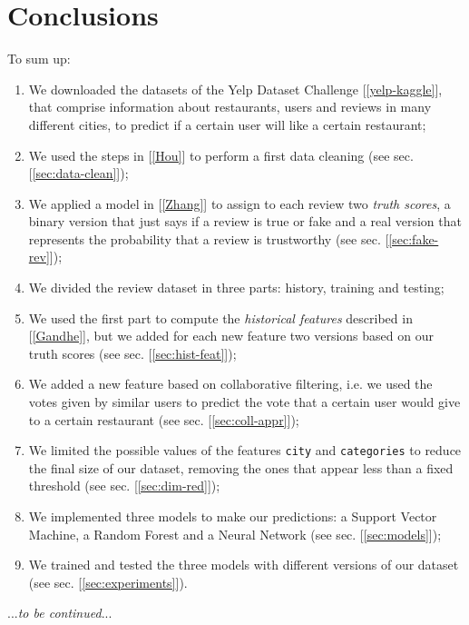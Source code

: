 
\section{Conclusions}

To sum up:
\begin{enumerate}
    \item We downloaded the datasets of the Yelp Dataset Challenge [\ref{yelp-kaggle}], that comprise information about restaurants, users and reviews in many different cities, to predict if a certain user will like a certain restaurant;
    \item We used the steps in [\ref{Hou}] to perform a first data cleaning (see sec. [\ref{sec:data-clean}]);
    \item We applied a model in [\ref{Zhang}] to assign to each review two \textit{truth scores}, a binary version that just says if a review is true or fake and a real version that represents the probability that a review is trustworthy (see sec. [\ref{sec:fake-rev}]);
    \item We divided the review dataset in three parts: history, training and testing;
    \item We used the first part to compute the \textit{historical features} described in [\ref{Gandhe}], but we added for each new feature two versions based on our truth scores (see sec. [\ref{sec:hist-feat}]);
    \item We added a new feature based on collaborative filtering, i.e. we used the votes given by similar users to predict the vote that a certain user would give to a certain restaurant (see sec. [\ref{sec:coll-appr}]);
    \item We limited the possible values of the features \texttt{city} and \texttt{categories} to reduce the final size of our dataset, removing the ones that appear less than a fixed threshold (see sec. [\ref{sec:dim-red}]);
    \item We implemented three models to make our predictions: a Support Vector Machine, a Random Forest and a Neural Network (see sec. [\ref{sec:models}]);
    \item We trained and tested the three models with different versions of our dataset (see sec. [\ref{sec:experiments}]).
\end{enumerate}

...\textit{to be continued}...
